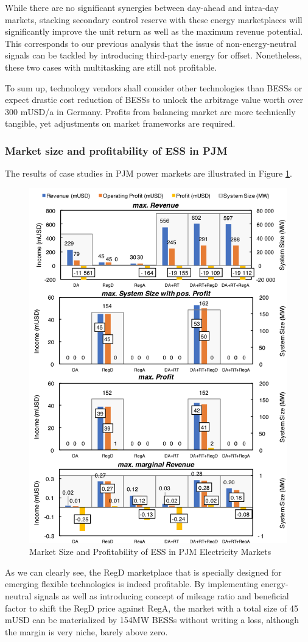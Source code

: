 While there are no significant synergies between day-ahead and intra-day markets, stacking secondary control reserve with these energy marketplaces will significantly improve the unit return as well as the maximum revenue potential. This corresponds to our previous analysis that the issue of non-energy-neutral signals can be tackled by introducing third-party energy for offset. Nonetheless, these  two cases with multitasking are still not profitable.

To sum up, technology vendors shall consider other technologies than BESSs or expect drastic cost reduction of BESSs to unlock the arbitrage value worth over 300 mUSD/a in Germany. Profits from balancing market are more technically tangible, yet adjustments on market frameworks are required.

\subsubsection{Market size and profitability of ESS in PJM}
The results of case studies in PJM power markets are illustrated in Figure \ref{fig:pjm-ess}.
\begin{figure}[h!]
	\centering
	\includegraphics[width=0.9\linewidth]{Figures/PJM_ESS}
	\caption{Market Size and Profitability of ESS in PJM Electricity Markets}
	\label{fig:pjm-ess}
\end{figure}
As we can clearly see, the RegD marketplace that is specially designed for emerging flexible technologies is indeed profitable. By implementing energy-neutral signals as well as introducing concept of mileage ratio and beneficial factor to shift the RegD price against RegA, the market with a total size of 45 mUSD can be materialized by 154MW BESSs without writing a loss, although the margin is very niche, barely above zero. 

